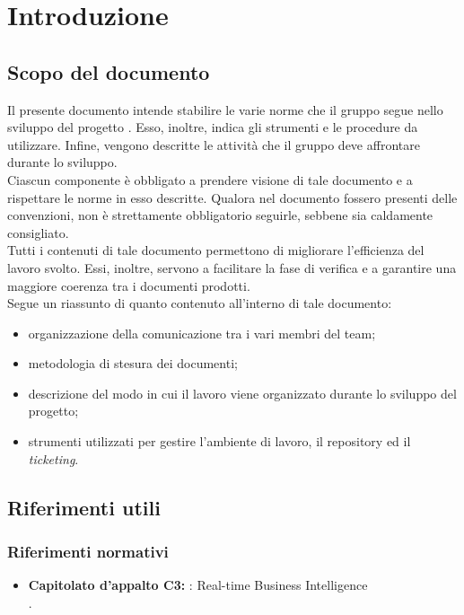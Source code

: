 \section{Introduzione}
	\subsection{Scopo del documento}
		Il presente documento intende stabilire le varie norme che il gruppo \groupname{} segue nello sviluppo del progetto \projectname{}. Esso, inoltre, indica gli strumenti e le procedure da utilizzare. Infine, vengono descritte le attività che il gruppo deve affrontare durante lo sviluppo.\\
		Ciascun componente è obbligato a prendere visione di tale documento e a rispettare le norme in esso descritte. Qualora nel documento fossero presenti delle convenzioni, non è strettamente obbligatorio seguirle, sebbene sia caldamente consigliato.\\
		Tutti i contenuti di tale documento permettono di migliorare l’efficienza del lavoro svolto. Essi, inoltre, servono a facilitare la fase di verifica e a garantire una maggiore coerenza tra i documenti prodotti.\\
		Segue un riassunto di quanto contenuto all'interno di tale documento:
		\begin{itemize}
			\item organizzazione della comunicazione tra i vari membri del team;
			\item metodologia di stesura dei documenti;
			\item descrizione del modo in cui il lavoro viene organizzato durante lo sviluppo del progetto;
			\item strumenti utilizzati per gestire l'ambiente di lavoro, il repository ed il \textit{ticketing}.
		\end{itemize}

	
	

	\subsection{Riferimenti utili}
		\subsubsection{Riferimenti normativi}
			\begin{itemize}
				\item\textbf{Capitolato d'appalto C3:} \projectname{}: Real-time Business Intelligence \\
					.
			\end{itemize}
